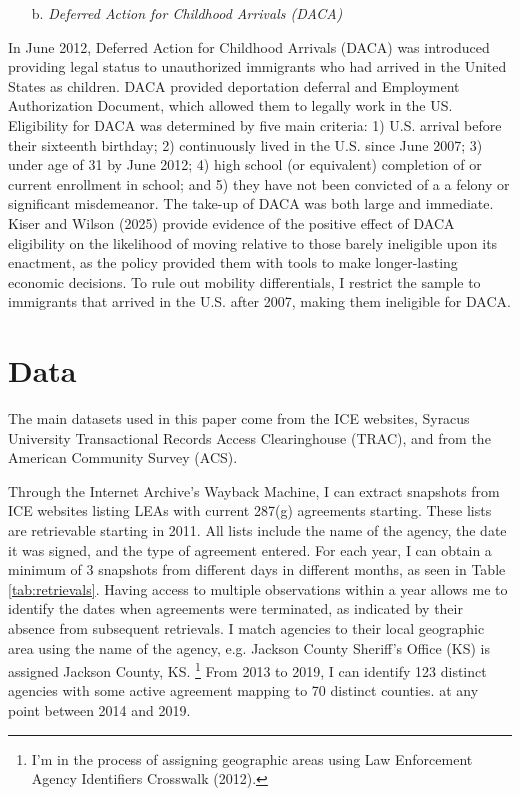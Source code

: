 \documentclass{article}
\begin{document}
\begin{itemize}
    \item[b.] \textit{Deferred Action for Childhood Arrivals (DACA)}
\end{itemize}

In June 2012, Deferred Action for Childhood Arrivals (DACA) was introduced providing legal status to unauthorized immigrants who had arrived in the United States as children. DACA provided deportation deferral and Employment Authorization Document, which allowed them to legally work in the US. Eligibility for DACA was determined by five main criteria:  1) U.S. arrival before their sixteenth birthday; 2) continuously lived in the U.S. since June 2007; 3) under age of 31 by June 2012; 4) high school (or equivalent) completion of or current enrollment in school; and 5) they have not been convicted of a a felony or significant misdemeanor. The take-up of DACA was both large and immediate. Kiser and Wilson (2025) provide evidence of the positive effect of DACA eligibility on the likelihood of moving relative to those barely ineligible upon its enactment, as the policy provided them with tools to make longer-lasting economic decisions. To rule out mobility differentials, I restrict the sample to immigrants that arrived in the U.S. after 2007, making them ineligible for DACA.


\section{Data}
The main datasets used in this paper come from the ICE websites,  Syracus University Transactional Records Access Clearinghouse (TRAC), and from the American Community Survey (ACS). 

Through the Internet Archive's Wayback Machine, I can extract snapshots from ICE websites listing LEAs with current 287(g) agreements starting. These lists are retrievable starting in 2011. All lists include the name of the agency, the date it was signed, and the type of agreement entered. For each year, I can obtain a minimum of 3 snapshots from different days in different months, as seen in Table \ref{tab:retrievals}. Having access to multiple observations within a year allows me to identify the dates when agreements were terminated, as indicated by their absence from subsequent retrievals. I match agencies to their local geographic area using the name of the agency, e.g. Jackson County Sheriff’s Office (KS) is assigned Jackson County, KS. \footnote{I'm in the process of assigning geographic areas using Law Enforcement Agency Identifiers Crosswalk (2012).} From 2013 to 2019, I can identify 123 distinct agencies with some active agreement mapping to 70 distinct counties. at any point between 2014 and 2019. 
\end{document}
